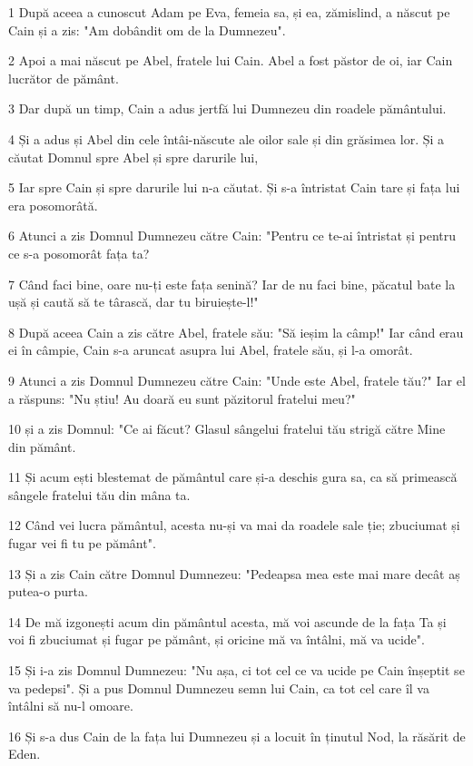 \par 1 După aceea a cunoscut Adam pe Eva, femeia sa, și ea, zămislind, a născut pe Cain și a zis: "Am dobândit om de la Dumnezeu".
\par 2 Apoi a mai născut pe Abel, fratele lui Cain. Abel a fost păstor de oi, iar Cain lucrător de pământ.
\par 3 Dar după un timp, Cain a adus jertfă lui Dumnezeu din roadele pământului.
\par 4 Și a adus și Abel din cele întâi-născute ale oilor sale și din grăsimea lor. Și a căutat Domnul spre Abel și spre darurile lui,
\par 5 Iar spre Cain și spre darurile lui n-a căutat. Și s-a întristat Cain tare și fața lui era posomorâtă.
\par 6 Atunci a zis Domnul Dumnezeu către Cain: "Pentru ce te-ai întristat și pentru ce s-a posomorât fața ta?
\par 7 Când faci bine, oare nu-ți este fața senină? Iar de nu faci bine, păcatul bate la ușă și caută să te târască, dar tu biruiește-l!"
\par 8 După aceea Cain a zis către Abel, fratele său: "Să ieșim la câmp!" Iar când erau ei în câmpie, Cain s-a aruncat asupra lui Abel, fratele său, și l-a omorât.
\par 9 Atunci a zis Domnul Dumnezeu către Cain: "Unde este Abel, fratele tău?" Iar el a răspuns: "Nu știu! Au doară eu sunt păzitorul fratelui meu?"
\par 10 și a zis Domnul: "Ce ai făcut? Glasul sângelui fratelui tău strigă către Mine din pământ.
\par 11 Și acum ești blestemat de pământul care și-a deschis gura sa, ca să primească sângele fratelui tău din mâna ta.
\par 12 Când vei lucra pământul, acesta nu-și va mai da roadele sale ție; zbuciumat și fugar vei fi tu pe pământ".
\par 13 Și a zis Cain către Domnul Dumnezeu: "Pedeapsa mea este mai mare decât aș putea-o purta.
\par 14 De mă izgonești acum din pământul acesta, mă voi ascunde de la fața Ta și voi fi zbuciumat și fugar pe pământ, și oricine mă va întâlni, mă va ucide".
\par 15 Și i-a zis Domnul Dumnezeu: "Nu așa, ci tot cel ce va ucide pe Cain înșeptit se va pedepsi". Și a pus Domnul Dumnezeu semn lui Cain, ca tot cel care îl va întâlni să nu-l omoare.
\par 16 Și s-a dus Cain de la fața lui Dumnezeu și a locuit în ținutul Nod, la răsărit de Eden.
